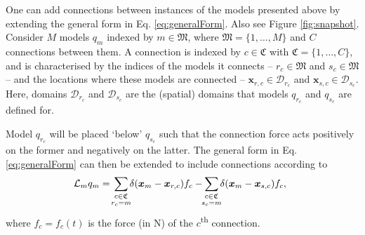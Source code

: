 \documentclass{article}
\begin{document}

One can add connections between instances of the models presented above by extending the general form in Eq. \eqref{eq:generalForm}. Also see Figure \ref{fig:snapshot}. Consider $M$ models $q_m$ indexed by $m \in \mathfrak{M}$, where $\mathfrak{M} = \{1, \hdots, M\}$ and $C$ connections between them. A connection is indexed by $c\in \mathfrak{C}$ with $\mathfrak{C} = \{1, \hdots, C\}$, and is characterised by the indices of the models it connects -- $r_c \in \mathfrak{M}$ and $s_c\in \mathfrak{M}$ -- and the locations where these models are connected -- $\boldsymbol{x}_{r, c}\in \mathcal{D}_{r_c}$ and $\boldsymbol{x}_{s, c}\in \mathcal{D}_{s_c}$. Here, domains $\mathcal{D}_{r_c}$ and $\mathcal{D}_{s_c}$ are the (spatial) domains that models $q_{r_c}$ and $q_{s_c}$ are defined for.  

Model $q_{r_c}$ will be placed `below' $q_{s_c}$ such that the connection force acts positively on the former and negatively on the latter. The general form in Eq. \eqref{eq:generalForm} can then be extended to include connections according to
\begin{equation}\label{eq:generalFormConnections}
    \!\!\!\mathcal{L}_mq_m =\!\sum_{\substack{c\in \mathfrak{C}\vspace{0.1em}\\ r_c = m}}\!\! \delta(\boldsymbol{x}_m - \boldsymbol{x}_{r, c}) f_c-\!\! \sum_{\substack{c\in \mathfrak{C}\vspace{0.1em}\\ s_c = m}}\!\! \delta(\boldsymbol{x}_m - \boldsymbol{x}_{s,c}) f_c,
\end{equation}
where $f_c = f_c(t)$ is the force (in N) of the $c$\textsuperscript{th} connection.
\end{document}
